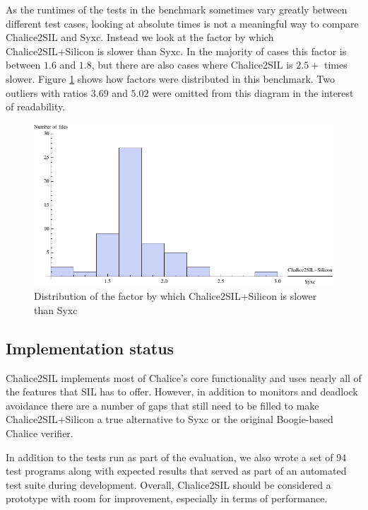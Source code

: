 As the runtimes of the tests in the benchmark sometimes vary greatly between different test cases, looking at absolute times is not a meaningful way to compare Chalice2SIL and Syxc. 
Instead we look at the factor by which Chalice2SIL+Silicon is slower than Syxc. 
In the majority of cases this factor is between $1.6$ and $1.8$, but there are also cases where Chalice2SIL is $2.5+$ times slower.
Figure \ref{fig:full-ratio-distribution} shows how factors were distributed in this benchmark. 
Two outliers with ratios $3.69$ and $5.02$ were omitted from this diagram in the interest of readability.

\begin{figure}
\includegraphics[width=145mm]{src/data/full-ratio-distribution.pdf}
\caption{Distribution of the factor by which Chalice2SIL+Silicon is slower than Syxc}\label{fig:full-ratio-distribution}
\end{figure}

\subsection{Implementation status}
Chalice2SIL implements most of Chalice's core functionality and uses nearly all of the features that SIL has to offer.
However, in addition to monitors and deadlock avoidance there are a number of gaps that still need to be filled to make Chalice2SIL+Silicon a true alternative to Syxc or the original Boogie-based Chalice verifier.

In addition to the tests run as part of the evaluation, we also wrote a set of 94 test programs along with expected results that served as part of an automated test suite during development.
Overall, Chalice2SIL should be considered a prototype with room for improvement, especially in terms of performance. 
